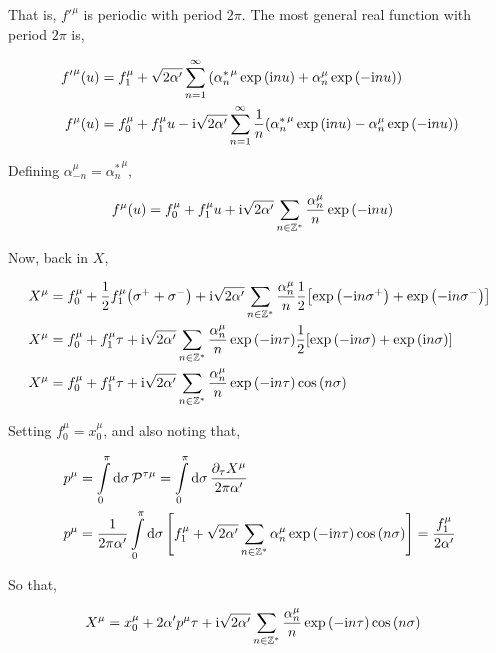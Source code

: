 That is, ${f'}^\mu$ is periodic with period $2\pi$. The most general real function with period $2\pi$ is,

\begin{align*}
    {f'}^\mu\qty(u)&=f_1^\mu+\sqrt{2\alpha'}\sum\limits_{n=1}^\infty\qty({\alpha^\ast_n}^\mu\exp\qty(\textnormal{i} n u)+\alpha_n^\mu\exp\qty(-\textnormal{i} n u))\\
    f^\mu\qty(u)&=f_0^\mu+f_1^\mu u-\textnormal{i}\sqrt{2\alpha'}\sum\limits_{n=1}^\infty\frac1n\qty({\alpha^\ast_n}^\mu\exp\qty(\textnormal{i} n u)-\alpha_n^\mu\exp\qty(-\textnormal{i} n u))
\end{align*}

Defining $\alpha_{-n}^\mu={\alpha^\ast_n}^\mu$,

\begin{align*}
    f^\mu\qty(u)&=f_0^\mu+f_1^\mu u+\textnormal{i}\sqrt{2\alpha'}\sum\limits_{n\in\mathbb Z^\ast}\frac{\alpha_n^\mu}{n}\exp\qty(-\textnormal{i} n u)
\end{align*}

Now, back in $X$,

\begin{align*}
    X^\mu&=f_0^\mu+\frac12f_1^\mu\qty(\sigma^++\sigma^-)+\textnormal{i}\sqrt{2\alpha'}\sum\limits_{n\in\mathbb Z^\ast}\frac{\alpha_n^\mu}{n}\frac12\qty[\exp\qty(-\textnormal{i} n \sigma^+)+\exp\qty(-\textnormal{i} n\sigma^-)]\\
    X^\mu&=f_0^\mu+f_1^\mu\tau+\textnormal{i}\sqrt{2\alpha'}\sum\limits_{n\in\mathbb Z^\ast}\frac{\alpha_n^\mu}{n}\exp\qty(-\textnormal{i} n\tau)\frac12\qty[\exp\qty(-\textnormal{i} n \sigma)+\exp\qty(\textnormal{i} n\sigma)]\\
    X^\mu&=f_0^\mu+f_1^\mu\tau+\textnormal{i}\sqrt{2\alpha'}\sum\limits_{n\in\mathbb Z^\ast}\frac{\alpha_n^\mu}{n}\exp\qty(-\textnormal{i} n\tau)\cos\qty(n\sigma)   
\end{align*}

Setting $f_0^\mu=x_0^\mu$, and also noting that,

\begin{align*}
    p^\mu&=\int\limits_0^\pi\dd{\sigma}\mathcal P^{\tau\mu}=\int\limits_0^\pi\dd{\sigma}\frac{\partial_\tau X^\mu}{2\pi\alpha'}\\
    p^\mu&=\frac{1}{2\pi\alpha'}\int\limits_0^\pi\dd{\sigma}\qty[f_1^\mu+\sqrt{2\alpha'}\sum\limits_{n\in\mathbb Z^\ast}\alpha_n^\mu\exp\qty(-\textnormal{i} n\tau)\cos\qty(n\sigma)]=\frac{f_1^\mu}{2\alpha'}   
\end{align*}

So that,

\begin{align*}
    X^\mu&=x_0^\mu+2\alpha' p^\mu\tau+\textnormal{i}\sqrt{2\alpha'}\sum\limits_{n\in\mathbb Z^\ast}\frac{\alpha_n^\mu}{n}\exp\qty(-\textnormal{i} n\tau)\cos\qty(n\sigma)   
\end{align*}

